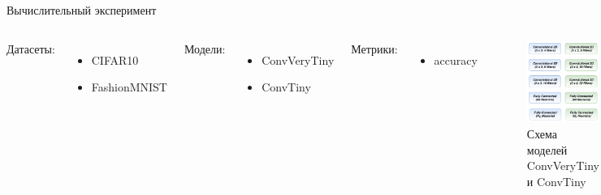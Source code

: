 \documentclass{beamer}
\begin{document}
\begin{frame}{Вычислительный эксперимент}
    \begin{columns}[c]
        Датасеты:
        \begin{itemize}
            \item CIFAR10
            \item FashionMNIST
        \end{itemize}
        Модели:
        \begin{itemize}
            \item ConvVeryTiny
            \item ConvTiny
        \end{itemize}
        Метрики:
        \begin{itemize}
            \item accuracy
        \end{itemize}
        \begin{figure}
            \includegraphics[width=1.0\textwidth]{conv_scheme.png}
            \caption{Схема моделей ConvVeryTiny и ConvTiny}
        \end{figure}
    \end{columns}
\end{frame}
\end{document}
